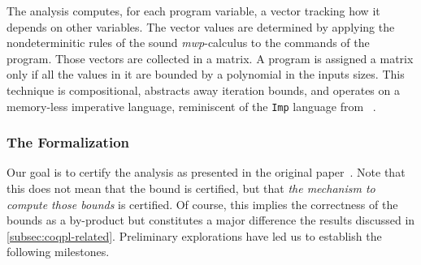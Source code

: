 The analysis computes, for each program variable, a vector tracking how it
depends on other variables. The vector values are
determined by applying the nondeterminitic rules of the
sound \emph{mwp}-calculus to the commands of the program.
Those vectors are collected in a matrix.
A program is assigned a matrix only if all the values in it
are bounded by a polynomial in the inputs sizes.
This technique is compositional, abstracts away \eg
iteration bounds, and operates on a memory-less imperative language, reminiscent
of the \texttt{Imp} language from ~\cite{cpierce20221}.

\subsubsection{The  Formalization}
\label{subsubsec:coqpl-the-coq-formalization}

Our goal is to certify the analysis as presented in {the original
paper}~\cite{jones2009}. Note that this does not mean that the bound is
certified, but that \emph{the mechanism to compute those bounds} is certified.
Of course, this implies the correctness of the bounds as a by-product but
constitutes a major difference \wrt the results discussed in
\autoref{subsec:coqpl-related}. Preliminary explorations have led us to
establish the following milestones.

